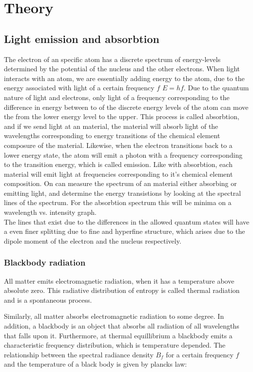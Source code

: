 \section{Theory}
\subsection{Light emission and absorbtion}

The electron of an specific atom has a discrete spectrum of energy-levels determined by the potential of the nucleus and the other electrons. When light interacts with an atom, we are essentially adding energy to the atom, due to the energy associated with light of a certain frequency $f$ $E=hf$. Due to the quantum nature of light and electrons, only light of a frequency corresponding to the difference in energy between to of the discrete energy levels of the atom can move the from the lower energy level to the upper. This process is called absorbtion, and if we send light at an material, the material will absorb light of the wavelengths corresponding to energy transitions of the chemical element composure of the material. Likewise, when the electron transitions back to a lower energy state, the atom will emit a photon with a frequency corresponding to the transition energy, which is called emission. Like with absorbtion, each material will emit light at frequencies corresponding to it's chemical element composition. On can measure the spectrum of an material either absorbing or emitting light, and determine the energy transistions by looking at the spectral lines of the spectrum. For the absorbtion spectrum this will be minima on a wavelength vs. intensity graph. \\

The lines that exist due to the differences in the allowed quantum states will have a even finer splitting due to fine and hyperfine structure, which arises due to the dipole moment of the electron and the nucleus respectively. 


\subsubsection{Blackbody radiation}
All matter emits electromagnetic radiation, when it has a temperature above absolute zero. This radiative distribution of entropy is called thermal radiation and is a spontaneous process.

Similarly, all matter absorbs electromagnetic radiation to some degree. In addition, a blackbody is an object that absorbs all radiation of all wavelengths that falls upon it. Furthermore, at thermal equillibrium a blackbody emits a characteristic frequency distribution, which is temperature depended. The relationship between the spectral radiance density $B_f$ for a certain frequency $f$ and the temperature of a black body is given by plancks law:


